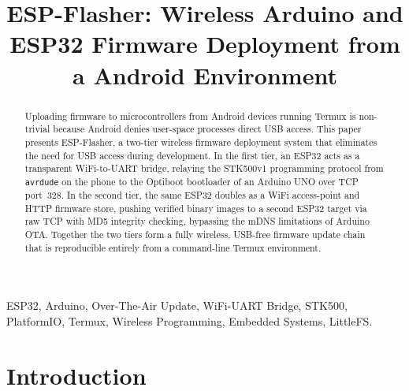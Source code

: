 \documentclass[conference]{IEEEtran}
\title{ESP-Flasher: Wireless Arduino and ESP32 Firmware Deployment from a Android Environment}
\author{
\IEEEauthorblockN{Darsh Gajare and Nishid Khandagre}
\IEEEauthorblockA{
Department of Electrical Engineering\\
IIT Hyderabad}
}
\begin{document}
\maketitle

\begin{abstract}
Uploading firmware to microcontrollers from Android devices running Termux is
non-trivial because Android denies user-space processes direct USB access.
This paper presents ESP-Flasher, a two-tier wireless firmware deployment
system that eliminates the need for USB access during development.
In the first tier, an ESP32 acts as a transparent WiFi-to-UART bridge, relaying
the STK500v1 programming protocol from \texttt{avrdude} on the phone to the
Optiboot bootloader of an Arduino UNO over TCP port~328.
In the second tier, the same ESP32 doubles as a WiFi access-point and
HTTP firmware store, pushing verified binary images to a second ESP32 target
via raw TCP with MD5 integrity checking, bypassing the mDNS limitations of
Arduino OTA.
Together the two tiers form a fully wireless, USB-free firmware update chain
that is reproducible entirely from a command-line Termux environment.
\end{abstract}

\begin{IEEEkeywords}
ESP32, Arduino, Over-The-Air Update, WiFi-UART Bridge, STK500, PlatformIO,
Termux, Wireless Programming, Embedded Systems, LittleFS.
\end{IEEEkeywords}

\section{Introduction}
\end{document}
